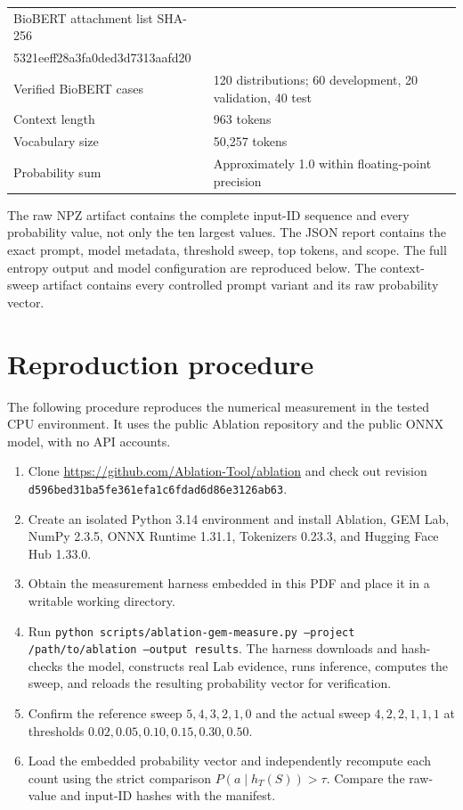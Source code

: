 \documentclass[11pt,a4paper]{article}
\begin{document}
\begin{table}[h]
\begin{tabular}{lp{8cm}}
BioBERT attachment list SHA-256 & \begin{minipage}[t]{8cm}\ttfamily\scriptsize e612fe3b6b0cfdd80c1e02adfb1b233bdb\\5321eeff28a3fa0ded3d7313aafd20\end{minipage} \\
Verified BioBERT cases & 120 distributions; 60 development, 20 validation, 40 test \\
Context length & 963 tokens \\
Vocabulary size & 50,257 tokens \\
Probability sum & Approximately 1.0 within floating-point precision \\
\bottomrule
\end{tabular}
\end{table}

The raw NPZ artifact contains the complete input-ID sequence and every probability value, not only the ten largest values. The JSON report contains the exact prompt, model metadata, threshold sweep, top tokens, and scope. The full entropy output and model configuration are reproduced below. The context-sweep artifact contains every controlled prompt variant and its raw probability vector.

\section{Reproduction procedure}
The following procedure reproduces the numerical measurement in the tested CPU environment. It uses the public Ablation repository and the public ONNX model, with no API accounts.

\begin{enumerate}[nosep]
  \item Clone \url{https://github.com/Ablation-Tool/ablation} and check out revision \texttt{d596bed31ba5fe361efa1c6fdad6d86e3126ab63}.
  \item Create an isolated Python 3.14 environment and install Ablation, GEM Lab, NumPy 2.3.5, ONNX Runtime 1.31.1, Tokenizers 0.23.3, and Hugging Face Hub 1.33.0.
  \item Obtain the measurement harness embedded in this PDF and place it in a writable working directory.
  \item Run \texttt{python scripts/ablation-gem-measure.py --project /path/to/ablation --output results}. The harness downloads and hash-checks the model, constructs real Lab evidence, runs inference, computes the sweep, and reloads the resulting probability vector for verification.
  \item Confirm the reference sweep $5,4,3,2,1,0$ and the actual sweep $4,2,2,1,1,1$ at thresholds $0.02,0.05,0.10,0.15,0.30,0.50$.
  \item Load the embedded probability vector and independently recompute each count using the strict comparison $P(a\mid h_T(S))>\tau$. Compare the raw-value and input-ID hashes with the manifest.
\end{enumerate}
\end{document}
